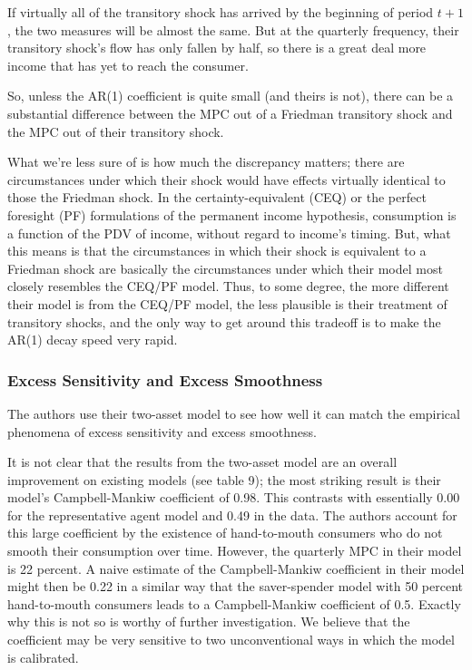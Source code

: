 \documentclass[titlepage]{econtex}
\begin{document}
If virtually all of the transitory shock has arrived by the beginning of period $t+1$, the two measures will be almost the same.  But at the quarterly frequency, their transitory shock's flow has only fallen by half, so there is a great deal more income that has yet to reach the consumer.  

So, unless the AR(1) coefficient is quite small (and theirs is not), there can be a substantial difference between the MPC out of a Friedman transitory shock and the MPC out of their transitory shock.

What we're less sure of is how much the discrepancy matters; there are circumstances under which their shock would have effects virtually identical to those the Friedman shock.  In the certainty-equivalent (CEQ) or the perfect foresight (PF) formulations of the permanent income hypothesis, consumption is a function of the PDV of income, without regard to income's timing.  But, what this means is that the circumstances in which their shock is equivalent to a Friedman shock are basically the circumstances under which their model most closely resembles the CEQ/PF model.  Thus, to some degree, the more different their model is from the CEQ/PF model, the less plausible is their treatment of transitory shocks, and the only way to get around this tradeoff is to make the AR(1) decay speed very rapid.


\subsubsection{Excess Sensitivity and Excess Smoothness}

The authors use their two-asset model to see how well it can match the empirical phenomena of excess sensitivity and excess smoothness. 


It is not clear that the results from the two-asset model are an overall improvement on existing models (see table 9); the most striking result is their model's Campbell-Mankiw coefficient of 0.98. This contrasts with essentially 0.00 for the representative agent model and 0.49 in the data. The authors account for this large coefficient by the existence of hand-to-mouth consumers who do not smooth their consumption over time. However, the quarterly MPC in their model is 22 percent. A naive estimate of the Campbell-Mankiw coefficient in their model might then be 0.22 in a similar way that the saver-spender model with 50 percent hand-to-mouth consumers leads to a Campbell-Mankiw coefficient of 0.5. Exactly why this is not so is worthy of further investigation. We believe that the coefficient may be very sensitive to two unconventional ways in which the model is calibrated.
\end{document}
